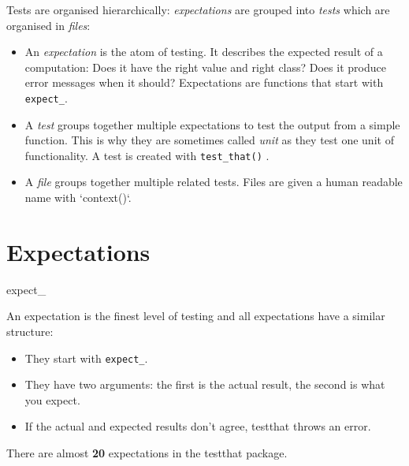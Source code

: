\documentclass[12pt,handout]{beamer}
\begin{document}
\begin{frame}[fragile]
Tests are organised hierarchically: \textit{expectations} are grouped into \textit{tests} which are organised in \textit{files}:

\begin{itemize}
\item An \textit{expectation} is the atom of testing. It describes the expected result 
  of a computation: Does it have the right value and right class? Does it 
  produce error messages when it should? Expectations are functions that start 
  with \texttt{expect\_}.

\item A \textit{test} groups together multiple expectations to test the output
  from a simple function. This is why they are sometimes called \textit{unit}
  as they test one unit of functionality. A test is created with \texttt{test\_that()} .

\item A \textit{file} groups together multiple related tests. Files are given a human 
  readable name with `context()`.

\end{itemize}


\end{frame}

\section{Expectations}

\begin{frame}[fragile]{expect\_}

An expectation is the finest level of testing and all expectations have a similar structure:

\begin{itemize}
\item They start with \texttt{expect\_}.

\item They have two arguments: the first is the actual result, the second is what 
  you expect.
  
\item If the actual and expected results don't agree, testthat throws an error.

\end{itemize}
There are almost \textbf{20} expectations in the testthat package.

\end{frame}
\end{document}
